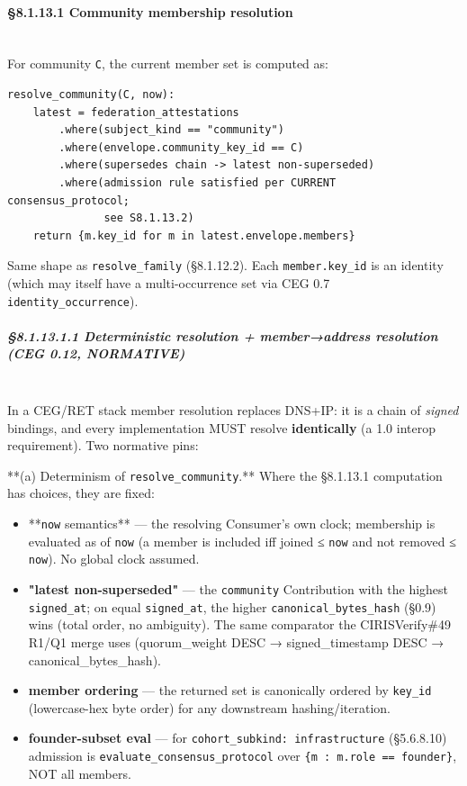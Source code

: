 \documentclass[11pt]{article}
\begin{document}
\paragraph{§8.1.13.1 Community membership resolution}\mbox{}\\


For community \texttt{C}, the current member set is computed as:


\begin{lstlisting}
resolve_community(C, now):
    latest = federation_attestations
        .where(subject_kind == "community")
        .where(envelope.community_key_id == C)
        .where(supersedes chain -> latest non-superseded)
        .where(admission rule satisfied per CURRENT consensus_protocol;
               see S8.1.13.2)
    return {m.key_id for m in latest.envelope.members}
\end{lstlisting}

Same shape as \texttt{resolve\_family} (§8.1.12.2). Each \texttt{member.key\_id} is an identity (which may itself have a multi-occurrence set via CEG 0.7 \texttt{identity\_occurrence}).


\subparagraph{§8.1.13.1.1 Deterministic resolution + member→address resolution (CEG 0.12, NORMATIVE)}\mbox{}\\


In a CEG/RET stack member resolution replaces DNS+IP: it is a chain of \textit{signed} bindings, and every implementation MUST resolve \textbf{identically} (a 1.0 interop requirement). Two normative pins:


**(a) Determinism of \texttt{resolve\_community}.** Where the §8.1.13.1 computation has choices, they are fixed:

\begin{itemize}\setlength\itemsep{0pt}
\item **\texttt{now} semantics** — the resolving Consumer's own clock; membership is evaluated as of \texttt{now} (a member is included iff joined ≤ \texttt{now} and not removed ≤ \texttt{now}). No global clock assumed.
\item \textbf{"latest non-superseded"} — the \texttt{community} Contribution with the highest \texttt{signed\_at}; on equal \texttt{signed\_at}, the higher \texttt{canonical\_bytes\_hash} (§0.9) wins (total order, no ambiguity). The same comparator the CIRISVerify\#49 R1/Q1 merge uses (quorum\_weight DESC → signed\_timestamp DESC → canonical\_bytes\_hash).
\item \textbf{member ordering} — the returned set is canonically ordered by \texttt{key\_id} (lowercase-hex byte order) for any downstream hashing/iteration.
\item \textbf{founder-subset eval} — for \texttt{cohort\_subkind: infrastructure} (§5.6.8.10) admission is \texttt{evaluate\_consensus\_protocol} over \texttt{\{m : m.role == founder\}}, NOT all members.
\end{itemize}
\end{document}
